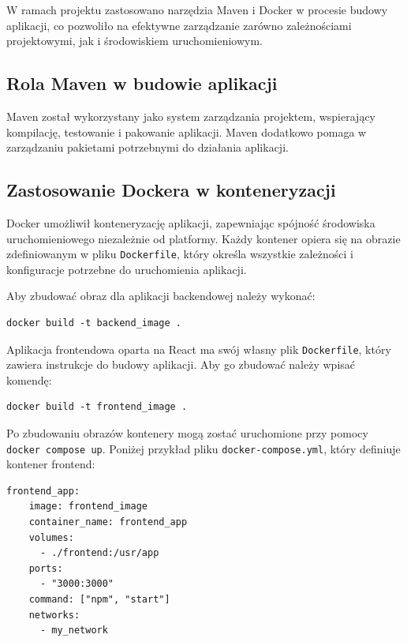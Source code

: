 W ramach projektu zastosowano narzędzia Maven i Docker w procesie budowy aplikacji, co pozwoliło na efektywne zarządzanie zarówno zależnościami projektowymi, jak i środowiskiem uruchomieniowym.

\subsection{Rola Maven w budowie aplikacji}

Maven został wykorzystany jako system zarządzania projektem, wspierający kompilację, testowanie i pakowanie aplikacji. Maven dodatkowo pomaga w zarządzaniu pakietami potrzebnymi do działania aplikacji.

\subsection{Zastosowanie Dockera w konteneryzacji}

Docker umożliwił konteneryzację aplikacji, zapewniając spójność środowiska uruchomieniowego niezależnie od platformy. Każdy kontener opiera się na obrazie zdefiniowanym w pliku \texttt{Dockerfile}, który określa wszystkie zależności i konfiguracje potrzebne do uruchomienia aplikacji. 

Aby zbudować obraz dla aplikacji backendowej należy wykonać:
\begin{lstlisting}[basicstyle=\footnotesize\ttfamily]
docker build -t backend_image .
\end{lstlisting}

Aplikacja frontendowa oparta na React ma swój własny plik \texttt{Dockerfile}, który zawiera instrukcje do budowy aplikacji. Aby go zbudować należy wpisać komendę:

\begin{lstlisting}[basicstyle=\footnotesize\ttfamily]
docker build -t frontend_image .
\end{lstlisting}


Po zbudowaniu obrazów kontenery mogą zostać uruchomione przy pomocy \texttt{docker compose up}. Poniżej przykład pliku \texttt{docker-compose.yml}, który definiuje kontener frontend:
\begin{lstlisting}[basicstyle=\footnotesize\ttfamily]
  frontend_app:
    image: frontend_image
    container_name: frontend_app
    volumes:
      - ./frontend:/usr/app
    ports:
      - "3000:3000"
    command: ["npm", "start"]
    networks:
      - my_network
\end{lstlisting}

